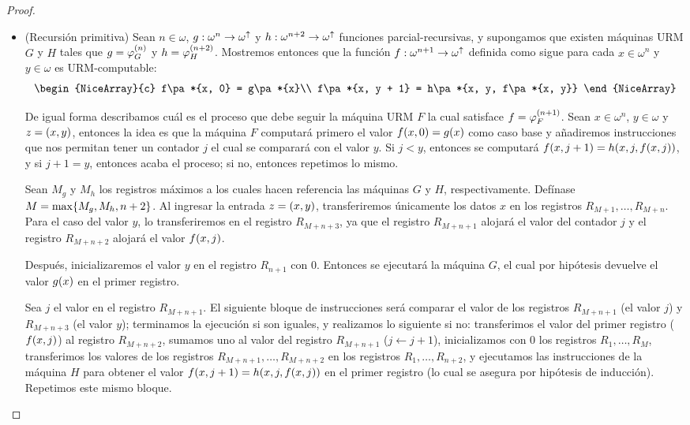 \begin{proof}
\begin{itemize}
\begin{itemize}
\begin{figure}[h!]
		\caption[Máquina URM de la composición]{Evolución de la cinta de la máquina $F$ al computar $f = h\pa*{g_{1},\dotsc, g_{k}}$ sobre la entrada $x =\pa*{x_{1},\dotsc, x_{n}}$}
		\label{fig:cinta_composicion}
	\end{figure}

			\item (Recursión primitiva) Sean $n\in\omega$, $g:\omega^{n}\to\omega^{\DIVERGE}$ y $h:\omega^{n + 2}\to\omega^{\DIVERGE}$ funciones parcial-recursivas, y supongamos que existen máquinas URM $G$ y $H$ tales que $g =\PHI{G}[n]$ y $h =\PHI{H}[n + 2]$. Mostremos entonces que la función $f:\omega^{n + 1}\to\omega^{\DIVERGE}$ definida como sigue para cada $x\in\omega^{n}$ y $y\in\omega$ es URM-computable:
	\[
		\begin{NiceArray}{c}
			f\pa*{x, 0} = g\pa*{x}\\
			f\pa*{x, y + 1} = h\pa*{x, y, f\pa*{x, y}}
		\end{NiceArray}
	\]

	De igual forma describamos cuál es el proceso que debe seguir la máquina URM $F$ la cual satisface $f =\PHI{F}[n + 1]$. Sean $x\in\omega^{n}$, $y\in\omega$ y $z =\pa*{x, y}$, entonces la idea es que la máquina $F$ computará primero el valor $f\pa*{x, 0} = g\pa*{x}$ como caso base y añadiremos instrucciones que nos permitan tener un contador $j$ el cual se comparará con el valor $y$. Si $j < y$, entonces se computará $f\pa*{x, j + 1} = h\pa*{x, j, f\pa*{x, j}}$, y si $j + 1 = y$, entonces acaba el proceso; si no, entonces repetimos lo mismo.

	Sean $M_{g}$ y $M_{h}$ los registros máximos a los cuales hacen referencia las máquinas $G$ y $H$, respectivamente. Defínase $M =\max\set*{M_{g}, M_{h}, n + 2}$. Al ingresar la entrada $z =\pa*{x, y}$, transferiremos únicamente los datos $x$ en los registros $R_{M + 1},\dotsc, R_{M + n}$. Para el caso del valor $y$, lo transferiremos en el registro $R_{M + n + 3}$, ya que el registro $R_{M + n + 1}$ alojará el valor del contador $j$ y el registro $R_{M + n + 2}$ alojará el valor $f\pa*{x, j}$.

	Después, inicializaremos el valor $y$ en el registro $R_{n + 1}$ con $0$. Entonces se ejecutará la máquina $G$, el cual por hipótesis devuelve el valor $g\pa*{x}$ en el primer registro.

	Sea $j$ el valor en el registro $R_{M + n + 1}$. El siguiente bloque de instrucciones será comparar el valor de los registros $R_{M + n + 1}$ (el valor $j$) y $R_{M + n + 3}$ (el valor $y$); terminamos la ejecución si son iguales, y realizamos lo siguiente si no: transferimos el valor del primer registro ($f\pa*{x, j}$) al registro $R_{M + n + 2}$, sumamos uno al valor del registro $R_{M + n + 1}$ ($j\leftarrow j + 1$), inicializamos con $0$ los registros $R_{1},\dotsc, R_{M}$, transferimos los valores de los registros $R_{M + n + 1},\dotsc, R_{M + n + 2}$ en los registros $R_{1},\dotsc, R_{n + 2}$, y ejecutamos las instrucciones de la máquina $H$ para obtener el valor $f\pa*{x, j + 1} = h\pa*{x, j, f\pa*{x, j}}$ en el primer registro (lo cual se asegura por hipótesis de inducción). Repetimos este mismo bloque.


\end{itemize}
\end{itemize}
\end{proof}
